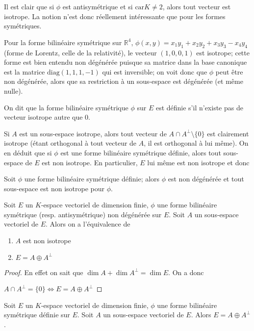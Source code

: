 \begin{rem}
Il est clair que si $\phi$ est antisymétrique et si $\mathrm{car} K \neq 2$, alors tout vecteur est isotrope. La notion n'est donc réellement intéressante que pour les formes symétriques.
\end{rem}

\begin{ex}
Pour la forme bilinéaire symétrique sur $\mathbb{R}^4$, $\phi(x,y) = x_1 y_1 + x_2 y_2 + x_3 y_3 - x_4 y_4$ (forme de Lorentz, celle de la relativité), le vecteur $(1,0,0,1)$ est isotrope; cette forme est bien entendu non dégénérée puisque sa matrice dans la base canonique est la matrice $\mathrm{diag}(1,1,1,-1)$ qui est inversible; on voit donc que $\phi$ peut être non dégénérée, alors que sa restriction à un sous-espace est dégénérée (et même nulle).
\end{ex}

\begin{de}
On dit que la forme bilinéaire symétrique $\phi$ sur $E$ est définie s'il n'existe pas de vecteur isotrope autre que 0.
\end{de}

\begin{rem}
Si $A$ est un sous-espace isotrope, alors tout vecteur de $A \cap A^\bot \setminus \{0\}$ est clairement isotrope (étant orthogonal à tout vecteur de $A$, il est orthogonal à lui même). On en déduit que si $\phi$ est une forme bilinéaire symétrique définie, alors tout sous-espace de $E$ est non isotrope. En particulier, $E$ lui même est non isotrope et donc
\end{rem}

\begin{prop}
Soit $\phi$ une forme bilinéaire symétrique définie; alors $\phi$ est non dégénérée et tout sous-espace est non isotrope pour $\phi$.
\end{prop}

\begin{thm}
Soit $E$ un $K$-espace vectoriel de dimension finie, $\phi$ une forme bilinéaire symétrique (resp. antisymétrique) non dégénérée sur $E$. Soit $A$ un sous-espace vectoriel de $E$. Alors on a l'équivalence de
\begin{enumerate}
\item $A$ est non isotrope
\item $E = A \oplus A^\bot$
\end{enumerate}
\end{thm}

\begin{proof}
En effet on sait que $\dim A + \dim A^\bot = \dim E$. On a donc

$A \cap A^\bot = \{0\} \Leftrightarrow E = A \oplus A^\bot$
\end{proof}

\begin{thm}
Soit $E$ un $K$-espace vectoriel de dimension finie, $\phi$ une forme bilinéaire symétrique définie sur $E$. Soit $A$ un sous-espace vectoriel de $E$. Alors $E = A \oplus A^\bot$.
\end{thm}